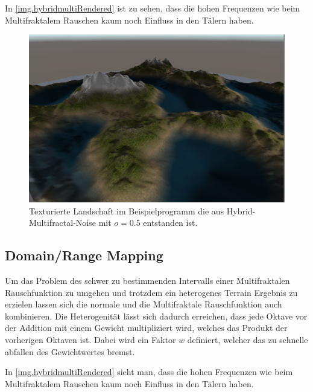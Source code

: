 In \autoref{img.hybridmultiRendered} ist zu sehen, dass die hohen Frequenzen wie beim Multifraktalem Rauschen kaum noch Einfluss in den Tälern haben.

\begin{figure}
	\centering
	\includegraphics[width=\textwidth]{images/hybridmulti_rendered.png}
	\caption{Texturierte Landschaft im Beispielprogramm die aus Hybrid-Multifractal-Noise mit $o=0.5$ entstanden ist.}\label{img.hybridmultiRendered}
\end{figure}




\subsection{Domain/Range Mapping}
Um das Problem des schwer zu bestimmenden Intervalls einer Multifraktalen Rauschfunktion zu umgehen und trotzdem ein heterogenes Terrain Ergebnis zu erzielen lassen sich die normale und die Multifraktale Rauschfunktion auch kombinieren. 
Die Heterogenität lässt sich dadurch erreichen, dass jede Oktave vor der Addition mit einem Gewicht multipliziert wird, welches das Produkt der vorherigen Oktaven ist. Dabei wird ein Faktor $w$ definiert, welcher das zu schnelle abfallen des Gewichtwertes bremst.

In \autoref{img.hybridmultiRendered} sieht man, dass die hohen Frequenzen wie beim Multifraktalem Rauschen  kaum noch Einfluss in den Tälern haben.

